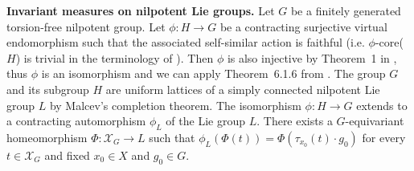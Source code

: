 \documentclass[12pt]{article}
\newcommand{\limGs}[1][G]{\mathcal{X}_{#1}}
\newtheorem{theor}{Theorem}
\theoremstyle{definition}
\begin{document}
\textbf{Invariant measures on nilpotent Lie groups.} Let $G$ be a finitely generated torsion-free
nilpotent group. Let $\phi:H\rightarrow G$ be a contracting surjective virtual endomorphism such
that the associated self-similar action is faithful (i.e. $\phi$-core($H$) is trivial in the
terminology of \cite{sidki:virt_nilp}). Then $\phi$ is also injective by Theorem~1 in
\cite{sidki:virt_nilp}, thus $\phi$ is an isomorphism and we can apply Theorem~6.1.6 from
\cite{self_sim_groups}. The group $G$ and its subgroup $H$ are uniform lattices of a simply
connected nilpotent Lie group $L$ by Malcev's completion theorem. The isomorphism
$\phi:H\rightarrow G$ extends to a contracting automorphism $\phi_L$ of the Lie group $L$. There
exists a $G$-equivariant homeomorphism $\Phi:\limGs\rightarrow L$ such that
$\phi_L(\Phi(t))=\Phi(\tau_{x_0}(t)\cdot g_0)$ for every $t\in\limGs$ and fixed $x_0\in X$ and
$g_0\in G$.







\end{document}
